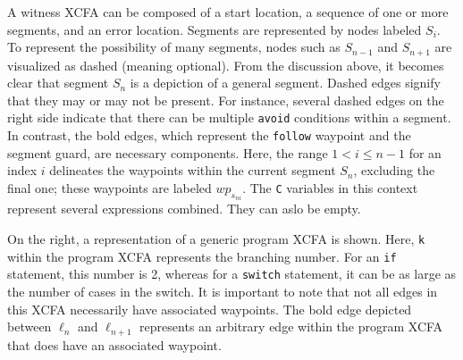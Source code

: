 A witness XCFA can be composed of a start location, a sequence of one or more segments, and 
an error location. Segments are represented by nodes labeled $S_i$.
To represent the possibility of many segments, nodes such as $S_{n-1}$ and $S_{n+1}$ are visualized as dashed (meaning optional).
From the discussion above, it becomes clear that segment $S_n$ is a depiction of a general segment.
Dashed edges signify that they may or may not be present. For instance, several dashed edges on 
the right side indicate that there can be multiple \texttt{avoid} conditions within a segment. 
In contrast, the bold edges, which represent the \texttt{follow} waypoint and the segment guard, 
are necessary components.
Here, the range $1 < i \le n-1$ for an index $i$ delineates the waypoints within the current segment 
$S_n$, excluding the final one; these waypoints are labeled $wp_{s_{ni}}$.
The \texttt{C} variables in this context represent several expressions combined. They can aslo be empty.


On the right, a representation of a generic program XCFA is shown.
Here, \texttt{k} within the program XCFA represents the branching number. 
For an \texttt{if} statement, this number is 2, whereas for a \texttt{switch} statement, 
it can be as large as the number of cases in the switch.
It is important to note that not all edges in this XCFA necessarily have associated waypoints.
The bold edge depicted between $\ell_n$ and $\ell_{n+1}$ represents 
an arbitrary edge within the program XCFA that does have an associated waypoint.

